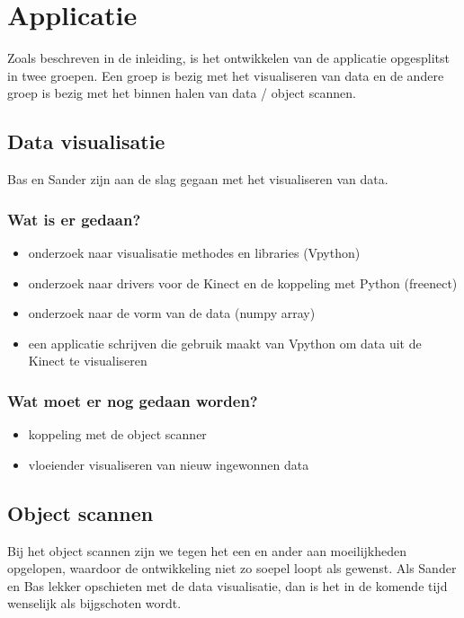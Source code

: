 \documentclass[10pt,a4paper]{article}
\begin{document}
\section{Applicatie}
Zoals beschreven in de inleiding, is het ontwikkelen van de applicatie opgesplitst in twee groepen. Een groep is bezig met het visualiseren van data en de andere groep is bezig met het binnen halen van data / object scannen.
\subsection{Data visualisatie}
Bas en Sander zijn aan de slag gegaan met het visualiseren van data. 
\subsubsection{Wat is er gedaan?}
\begin{itemize}
\item onderzoek naar visualisatie methodes en libraries (Vpython)
\item onderzoek naar drivers voor de Kinect en de koppeling met Python (freenect)
\item onderzoek naar de vorm van de data (numpy array)
\item een applicatie schrijven die gebruik maakt van Vpython om data uit de Kinect te visualiseren
\end{itemize}
\subsubsection{Wat moet er nog gedaan worden?}
\begin{itemize}
\item koppeling met de object scanner
\item vloeiender visualiseren van nieuw ingewonnen data
\end{itemize}

\subsection{Object scannen}
Bij het object scannen zijn we tegen het een en ander aan moeilijkheden opgelopen, waardoor de ontwikkeling niet zo soepel loopt als gewenst. Als Sander en Bas lekker opschieten met de data visualisatie, dan is het in de komende tijd wenselijk als bijgschoten wordt. 
\end{document}
